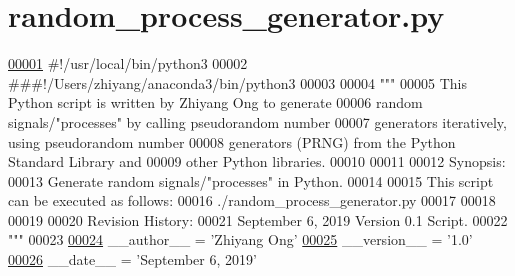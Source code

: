 \hypertarget{random__process__generator_8py_source}{}\section{random\+\_\+process\+\_\+generator.\+py}
\label{random__process__generator_8py_source}

\begin{DoxyCode}
\hypertarget{random__process__generator_8py_source_l00001}{}\hyperlink{namespacerandom__process__models_1_1random__process__generator}{00001} \textcolor{comment}{#!/usr/local/bin/python3}
00002 \textcolor{comment}{###!/Users/zhiyang/anaconda3/bin/python3}
00003 
00004 \textcolor{stringliteral}{"""}
00005 \textcolor{stringliteral}{    This Python script is written by Zhiyang Ong to generate}
00006 \textcolor{stringliteral}{        random signals/"processes" by calling pseudorandom number}
00007 \textcolor{stringliteral}{        generators iteratively, using pseudorandom number}
00008 \textcolor{stringliteral}{        generators (PRNG) from the Python Standard Library and}
00009 \textcolor{stringliteral}{        other Python libraries.}
00010 \textcolor{stringliteral}{}
00011 \textcolor{stringliteral}{}
00012 \textcolor{stringliteral}{    Synopsis:}
00013 \textcolor{stringliteral}{    Generate random signals/"processes" in Python.}
00014 \textcolor{stringliteral}{}
00015 \textcolor{stringliteral}{    This script can be executed as follows:}
00016 \textcolor{stringliteral}{    ./random\_process\_generator.py}
00017 \textcolor{stringliteral}{}
00018 \textcolor{stringliteral}{}
00019 \textcolor{stringliteral}{}
00020 \textcolor{stringliteral}{    Revision History:}
00021 \textcolor{stringliteral}{    September 6, 2019           Version 0.1 Script.}
00022 \textcolor{stringliteral}{"""}
00023 
\hypertarget{random__process__generator_8py_source_l00024}{}\hyperlink{namespacerandom__process__models_1_1random__process__generator_ad5ac8c8c735362abc3272ed79347b666}{00024} \_\_author\_\_ = \textcolor{stringliteral}{'Zhiyang Ong'}
\hypertarget{random__process__generator_8py_source_l00025}{}\hyperlink{namespacerandom__process__models_1_1random__process__generator_ab646d91986add5570041ec883e29d8da}{00025} \_\_version\_\_ = \textcolor{stringliteral}{'1.0'}
\hypertarget{random__process__generator_8py_source_l00026}{}\hyperlink{namespacerandom__process__models_1_1random__process__generator_ad850a80bfc86ef183d906895e7f75402}{00026} \_\_date\_\_ = \textcolor{stringliteral}{'September 6, 2019'}

\end{DoxyCode}

